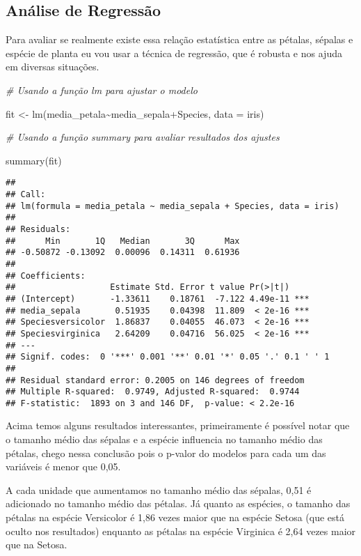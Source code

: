 \documentclass[
]{book}
\newenvironment{Shaded}{\begin{snugshade}}{\end{snugshade}}
\newcommand{\AttributeTok}[1]{\textcolor[rgb]{0.77,0.63,0.00}{#1}}
\newcommand{\CommentTok}[1]{\textcolor[rgb]{0.56,0.35,0.01}{\textit{#1}}}
\newcommand{\FunctionTok}[1]{\textcolor[rgb]{0.00,0.00,0.00}{#1}}
\newcommand{\NormalTok}[1]{#1}
\newcommand{\OtherTok}[1]{\textcolor[rgb]{0.56,0.35,0.01}{#1}}
\newcommand{\SpecialCharTok}[1]{\textcolor[rgb]{0.00,0.00,0.00}{#1}}
\begin{document}
\hypertarget{anuxe1lise-de-regressuxe3o}{%
\subsection{Análise de Regressão}\label{anuxe1lise-de-regressuxe3o}}

Para avaliar se realmente existe essa relação estatística entre as pétalas, sépalas e espécie de planta eu vou usar a técnica de regressão, que é robusta e nos ajuda em diversas situações.

\begin{Shaded}
\begin{Highlighting}[]
\CommentTok{\# Usando a função lm para ajustar o modelo}

\NormalTok{fit }\OtherTok{\textless{}{-}} \FunctionTok{lm}\NormalTok{(media\_petala}\SpecialCharTok{\textasciitilde{}}\NormalTok{media\_sepala}\SpecialCharTok{+}\NormalTok{Species, }\AttributeTok{data =}\NormalTok{ iris)}

\CommentTok{\# Usando a função summary para avaliar resultados dos ajustes}

\FunctionTok{summary}\NormalTok{(fit)}
\end{Highlighting}
\end{Shaded}

\begin{verbatim}
## 
## Call:
## lm(formula = media_petala ~ media_sepala + Species, data = iris)
## 
## Residuals:
##      Min       1Q   Median       3Q      Max 
## -0.50872 -0.13092  0.00096  0.14311  0.61936 
## 
## Coefficients:
##                   Estimate Std. Error t value Pr(>|t|)    
## (Intercept)       -1.33611    0.18761  -7.122 4.49e-11 ***
## media_sepala       0.51935    0.04398  11.809  < 2e-16 ***
## Speciesversicolor  1.86837    0.04055  46.073  < 2e-16 ***
## Speciesvirginica   2.64209    0.04716  56.025  < 2e-16 ***
## ---
## Signif. codes:  0 '***' 0.001 '**' 0.01 '*' 0.05 '.' 0.1 ' ' 1
## 
## Residual standard error: 0.2005 on 146 degrees of freedom
## Multiple R-squared:  0.9749, Adjusted R-squared:  0.9744 
## F-statistic:  1893 on 3 and 146 DF,  p-value: < 2.2e-16
\end{verbatim}

Acima temos alguns resultados interessantes, primeiramente é possível notar que o tamanho médio das sépalas e a espécie influencia no tamanho médio das pétalas, chego nessa conclusão pois o p-valor do modelos para cada um das variáveis é menor que 0,05.

A cada unidade que aumentamos no tamanho médio das sépalas, 0,51 é adicionado no tamanho médio das pétalas. Já quanto as espécies, o tamanho das pétalas na espécie Versicolor é 1,86 vezes maior que na espécie Setosa (que está oculto nos resultados) enquanto as pétalas na espécie Virginica é 2,64 vezes maior que na Setosa.
\end{document}
